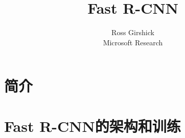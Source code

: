 \documentclass{ctexart}
\title{Fast R-CNN}
\author{Ross Girshick \\ Microsoft Research}
\date{}
\begin{document}
\maketitle
\begin{abstract}
    
\end{abstract}
\section{简介}

\section{Fast R-CNN的架构和训练}

\printbibliography
\end{document}

